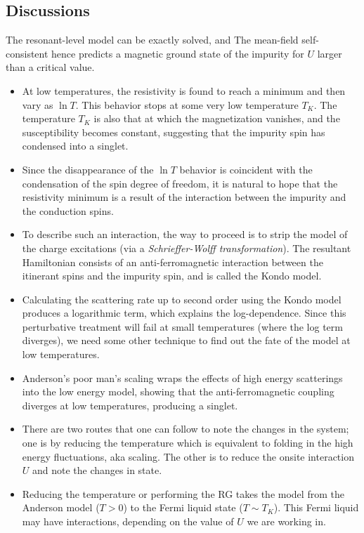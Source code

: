 \subsection{Discussions}
The resonant-level model can be exactly solved, and 
The mean-field self-consistent hence predicts a magnetic ground state of the impurity for \(U\) larger than a critical value.
\begin{itemize}
	\item At low temperatures, the resistivity is found to reach a minimum and then vary as \(\ln T\). This behavior stops at some very low temperature \(T_K\). The temperature \(T_K\) is also that at which the magnetization vanishes, and the susceptibility becomes constant, suggesting that the impurity spin has condensed into a singlet.
	\item Since the disappearance of the \(\ln T\) behavior is coincident with the condensation of the spin degree of freedom, it is natural to hope that the resistivity minimum is a result of the interaction between the impurity and the conduction spins.
    \item To describe such an interaction, the way to proceed is to strip the model of the charge excitations (via a \textit{Schrieffer-Wolff transformation}).
The resultant Hamiltonian consists of an anti-ferromagnetic interaction between the itinerant spins and the impurity spin, and is called the Kondo model.
    \item Calculating the scattering rate up to second order using the Kondo model produces a logarithmic term, which explains the log-dependence. Since this perturbative treatment will fail at small temperatures (where the log term diverges), we need some other technique to find out the fate of the model at low temperatures.
    \item Anderson's poor man's scaling wraps the effects of high energy scatterings into the low energy model, showing that the anti-ferromagnetic coupling diverges at low temperatures, producing a singlet.
    \item There are two routes that one can follow to note the changes in the system; one is by reducing the temperature which is equivalent to folding in the high energy fluctuations, aka scaling.
	    The other is to reduce the onsite interaction \(U\) and note the changes in state.
    \item Reducing the temperature or performing the RG takes the model from the Anderson model (\(T>0\)) to the Fermi liquid state (\(T \sim T_K\)).
	    This Fermi liquid may have interactions, depending on the value of \(U\) we are working in.

\end{itemize}
